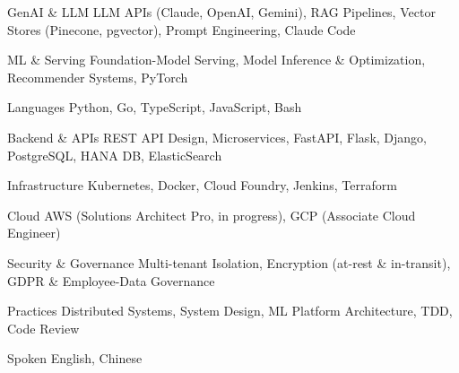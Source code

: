 

\begin{cvskills}

  \cvskill
    {GenAI \& LLM} %
    {LLM APIs (Claude, OpenAI, Gemini), RAG Pipelines, Vector Stores (Pinecone, pgvector), Prompt Engineering, Claude Code} %

  \cvskill
    {ML \& Serving} %
    {Foundation-Model Serving, Model Inference \& Optimization, Recommender Systems, PyTorch} %

  \cvskill
    {Languages} %
    {Python, Go, TypeScript, JavaScript, Bash} %

  \cvskill
    {Backend \& APIs} %
    {REST API Design, Microservices, FastAPI, Flask, Django, PostgreSQL, HANA DB, ElasticSearch} %

  \cvskill
    {Infrastructure} %
    {Kubernetes, Docker, Cloud Foundry, Jenkins, Terraform} %

  \cvskill
    {Cloud} %
    {AWS (Solutions Architect Pro, in progress), GCP (Associate Cloud Engineer)} %

  \cvskill
    {Security \& Governance} %
    {Multi-tenant Isolation, Encryption (at-rest \& in-transit), GDPR \& Employee-Data Governance} %

  \cvskill
    {Practices} %
    {Distributed Systems, System Design, ML Platform Architecture, TDD, Code Review} %

  \cvskill
    {Spoken} %
    {English, Chinese} %


\end{cvskills}
